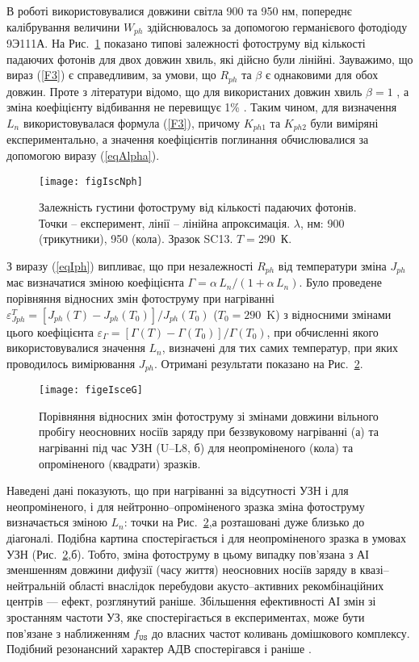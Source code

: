 В роботі використовувалися довжини світла 900 та 950 нм,
попереднє калібрування величини $W_{ph}$ здійснювалось
за допомогою германієвого фотодіоду 9Э111А.
На Рис.~\ref{figIscNph} показано типові залежності фотоструму від
кількості падаючих фотонів для двох довжин хвиль,
які дійсно були лінійні.
Зауважимо, що вираз (\ref{F3}) є справедливим,
за умови, що $R_{ph}$ та $\beta$ є однаковими для обох довжин.
Проте з літератури відомо, що для використаних довжин хвиль
$\beta=1$ \cite{Gaman}, а зміна коефіцієнту відбивання не перевищує 1\% \cite{GreenOptic,SiOptic:JAP1998,GreenOptic2}.
Таким чином, для визначення $L_n$ використовувалася формула (\ref{F3}),
причому $K_{ph1}$ та $K_{ph2}$ були виміряні експериментально, а значення
коефіцієнтів поглинання обчислювалися за допомогою виразу (\ref{eqAlpha}).

\begin{figure}
\center
\texttt{[image: figIscNph]}
\caption{\label{figIscNph}
Залежність густини фотоструму від кількості падаючих фотонів.
Точки – експеримент, лінії – лінійна апроксимація.
$\lambda$, нм: 900 (трикутники), 950 (кола). Зразок SC13. $T = 290$~К.
}%
\end{figure}

З виразу (\ref{eqIph}) випливає, що при незалежності $R_{ph}$ від температури
зміна $J_{ph}$ має визначатися зміною
коефіцієнта $\Gamma=\alpha\,L_n/(1+\alpha\,L_n)$.
Було проведене порівняння відносних змін
фотоструму при нагріванні $\varepsilon^T_{Jph}=[J_{ph}(T)-J_{ph}(T_0)]/J_{ph}(T_0)$
($T_0=290$~K)
з відносними змінами цього коефіцієнта $\varepsilon_\Gamma=[\Gamma(T)-\Gamma(T_0)]/\Gamma(T_0)$,
при обчисленні якого використовувалися значення  $L_n$, визначені
для тих самих температур, при яких проводилось вимірювання $J_{ph}$.
Отримані результати показано на Рис.~\ref{figeIsceG}.


\begin{figure}
\center
\texttt{[image: figeIsceG]}
\caption{\label{figeIsceG}
Порівняння відносних змін фотоструму зі змінами довжини
вільного пробігу неосновних носіїв заряду при беззвуковому
нагріванні (а) та нагріванні під час УЗН (U--L8, б)
для неопроміненого (кола) та опроміненого (квадрати) зразків.
}%
\end{figure}

Наведені дані показують, що при нагріванні за відсутності УЗН і для неопроміненого,
і для нейтронно--опроміненого зразка зміна фотоструму визначається зміною
$L_n$:
точки на Рис.~\ref{figeIsceG},а розташовані дуже близько до діагоналі.
Подібна картина спостерігається і для неопроміненого зразка в
умовах УЗН (Рис.~\ref{figeIsceG},б).
Тобто, зміна фотоструму в цьому випадку пов'язана з АІ зменшенням
довжини дифузії (часу життя) неосновних носіїв заряду в квазі--нейтральній
області внаслідок перебудови акусто--активних рекомбінаційних центрів ---
ефект, розглянутий раніше.
Збільшення ефективності АІ змін зі зростанням частоти УЗ, яке
спостерігається в експериментах, може бути пов'язане з наближенням
$f_\mathtt{US}$ до власних частот коливань домішкового комплексу.
Подібний резонансний характер АДВ спостерігався і раніше \cite{Ol_Shav}.




